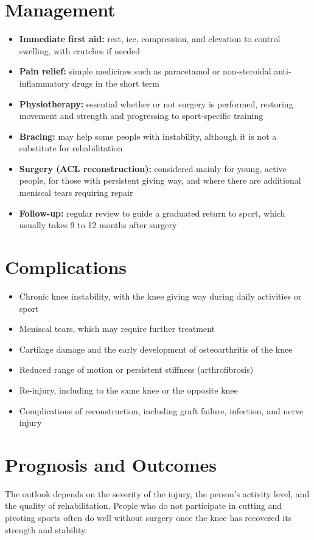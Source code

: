 \section*{Management}
\begin{itemize}
    \item \textbf{Immediate first aid:} rest, ice, compression, and elevation to control swelling, with crutches if needed
    \item \textbf{Pain relief:} simple medicines such as paracetamol or non-steroidal anti-inflammatory drugs in the short term
    \item \textbf{Physiotherapy:} essential whether or not surgery is performed, restoring movement and strength and progressing to sport-specific training
    \item \textbf{Bracing:} may help some people with instability, although it is not a substitute for rehabilitation
    \item \textbf{Surgery (ACL reconstruction):} considered mainly for young, active people, for those with persistent giving way, and where there are additional meniscal tears requiring repair
    \item \textbf{Follow-up:} regular review to guide a graduated return to sport, which usually takes 9 to 12 months after surgery
\end{itemize}

\section*{Complications}
\begin{itemize}
    \item Chronic knee instability, with the knee giving way during daily activities or sport
    \item Meniscal tears, which may require further treatment
    \item Cartilage damage and the early development of osteoarthritis of the knee
    \item Reduced range of motion or persistent stiffness (arthrofibrosis)
    \item Re-injury, including to the same knee or the opposite knee
    \item Complications of reconstruction, including graft failure, infection, and nerve injury
\end{itemize}

\section*{Prognosis and Outcomes}
The outlook depends on the severity of the injury, the person's activity level, and the quality of rehabilitation. People who do not participate in cutting and pivoting sports often do well without surgery once the knee has recovered its strength and stability.

